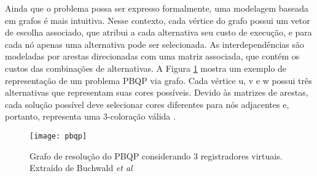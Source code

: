 \documentclass[
	12pt,				%
	openright,			%
	oneside,			%
	a4paper,			%
	tccpreliminar,			%
	]{ABNT-DC-UEL}
\begin{document}
Ainda que o problema possa ser expresso formalmente, uma modelagem baseada em grafos é mais intuitiva. Nesse contexto, cada vértice do grafo possui um vetor de escolha associado, que atribui a cada alternativa seu custo de execução, e para cada nó apenas uma alternativa pode ser selecionada. As interdependências são modeladas por arestas direcionadas com uma matriz associada, que contém os custos das combinações de alternativas. A Figura \ref{fig:9} mostra um exemplo de representação de um problema PBQP via grafo. Cada vértice u, v e w possui três alternativas que representam suas cores possíveis. Devido às matrizes de arestas, cada solução possível deve selecionar cores diferentes para nós adjacentes e, portanto, representa uma 3-coloração válida \cite{buchwald:11}.

\begin{figure}
    \centering
    \texttt{[image: pbqp]}
    \caption{Grafo de resolução do PBQP considerando 3 registradores virtuais. Extraído de Buchwald \textit{et al} \cite{buchwald:11}}
    \label{fig:9}
\end{figure}
\end{document}
